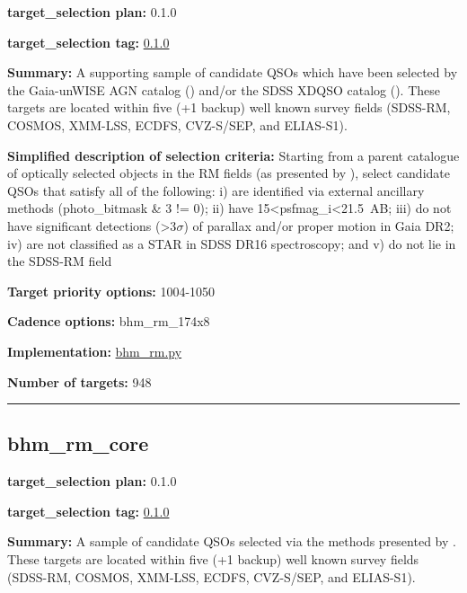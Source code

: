 \noindent\textbf{target\_selection plan:} 0.1.0

\noindent\textbf{target\_selection tag:}
\href{https://github.com/sdss/target_selection/tree/0.1.0/}{0.1.0}

\noindent\textbf{Summary:} A supporting sample of candidate QSOs which have been
selected by the Gaia-unWISE AGN catalog
(\citealt{Shu2019}) and/or the SDSS XDQSO catalog
(\citealt{Bovy2011}). These targets are located within five (+1 backup) well
known survey fields (SDSS-RM, COSMOS, XMM-LSS, ECDFS, CVZ-S/SEP, and
ELIAS-S1).

\noindent\textbf{Simplified description of selection criteria:} Starting from a
parent catalogue of optically selected objects in the RM fields (as
presented by
\citealt{Yang2022}), select candidate QSOs that satisfy all of the
following: i) are identified via external ancillary methods
(photo\_bitmask \& 3 != 0); ii) have
15\textless psfmag\_i\textless21.5~AB; iii) do not have significant
detections (\textgreater3$\sigma$) of parallax and/or proper motion in Gaia
DR2; iv) are not classified as a STAR in SDSS DR16 spectroscopy; and v)
do not lie in the SDSS-RM field


\noindent\textbf{Target priority options:} 1004-1050

\noindent\textbf{Cadence options:} bhm\_rm\_174x8

\noindent\textbf{Implementation:}
\href{https://github.com/sdss/target_selection/blob/0.1.0/python/target_selection/cartons/bhm_rm.py}{bhm\_rm.py}

\noindent\textbf{Number of targets:} 948

\begin{center}\rule{0.5\linewidth}{0.5pt}\end{center}

\hypertarget{bhm_rm_core_plan0.1.0}{%
\subsection{bhm\_rm\_core}\label{bhm_rm_core_plan0.1.0}}

\noindent\textbf{target\_selection plan:} 0.1.0

\noindent\textbf{target\_selection tag:}
\href{https://github.com/sdss/target_selection/tree/0.1.0/}{0.1.0}

\noindent\textbf{Summary:} A sample of candidate QSOs selected via the methods
presented by
\citet{Yang2022}. These targets are located within five (+1 backup) well
known survey fields (SDSS-RM, COSMOS, XMM-LSS, ECDFS, CVZ-S/SEP, and
ELIAS-S1).


